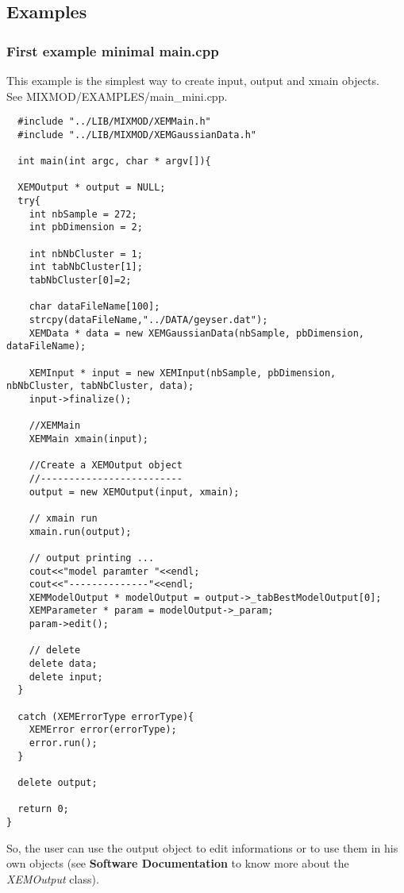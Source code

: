 \subsection{Examples}

\subsubsection{First example minimal main.cpp}
This example is the simplest way to create input, output and xmain objects.\\
See MIXMOD/EXAMPLES/main\_mini.cpp.\\
{\scriptsize
\begin{verbatim}
  #include "../LIB/MIXMOD/XEMMain.h"
  #include "../LIB/MIXMOD/XEMGaussianData.h"

  int main(int argc, char * argv[]){

  XEMOutput * output = NULL;
  try{
    int nbSample = 272;
    int pbDimension = 2;

    int nbNbCluster = 1;
    int tabNbCluster[1];
    tabNbCluster[0]=2;

    char dataFileName[100];
    strcpy(dataFileName,"../DATA/geyser.dat");
    XEMData * data = new XEMGaussianData(nbSample, pbDimension, dataFileName);

    XEMInput * input = new XEMInput(nbSample, pbDimension, nbNbCluster, tabNbCluster, data);
    input->finalize();

    //XEMMain
    XEMMain xmain(input);

    //Create a XEMOutput object
    //-------------------------
    output = new XEMOutput(input, xmain);

    // xmain run
    xmain.run(output);

    // output printing ...
    cout<<"model paramter "<<endl;
    cout<<"--------------"<<endl;
    XEMModelOutput * modelOutput = output->_tabBestModelOutput[0];
    XEMParameter * param = modelOutput->_param;
    param->edit();

    // delete
    delete data;
    delete input;
  }

  catch (XEMErrorType errorType){
    XEMError error(errorType);
    error.run();
  }

  delete output;

  return 0;
}
\end{verbatim}}

So, the user can use the output object to edit informations or to use them in his own objects
(see {\bf Software Documentation} to know more about the {\it XEMOutput} class).\\


